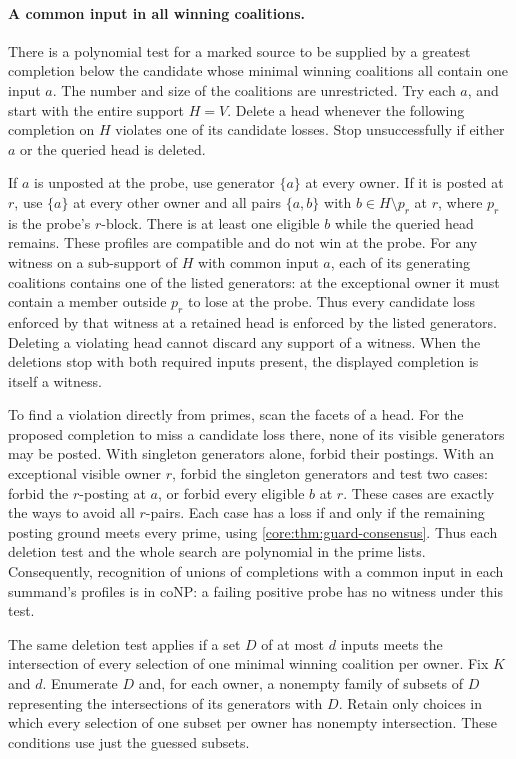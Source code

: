 \paragraph{A common input in all winning coalitions.}
There is a polynomial test for a marked source to be supplied
by a greatest completion below the candidate whose minimal
winning coalitions all contain one input $a$. The number and
size of the coalitions are unrestricted. Try each $a$, and
start with the entire support $H=V$. Delete a head whenever
the following completion on $H$ violates one of its candidate
losses. Stop unsuccessfully if either $a$ or the queried head
is deleted.

If $a$ is unposted at the probe, use generator $\{a\}$
at every owner. If it is posted at $r$, use $\{a\}$ at every
other owner and all pairs $\{a,b\}$ with $b\in H\setminus p_r$
at $r$, where $p_r$ is the probe's $r$-block. There is at
least one eligible $b$ while the queried head remains.
These profiles are compatible and do not win at the probe.
For any witness on a sub-support of $H$ with common input $a$,
each of its generating coalitions contains one of the listed
generators: at the exceptional owner it must contain a member
outside $p_r$ to lose at the probe. Thus every candidate loss
enforced by that witness at a retained head is enforced by the
listed generators. Deleting a violating head cannot discard
any support of a witness. When the deletions stop with both
required inputs present, the displayed completion is itself
a witness.

To find a violation directly from primes, scan the facets
of a head. For the proposed completion to miss a candidate
loss there, none of its visible generators may be posted.
With singleton generators alone, forbid their postings.
With an exceptional visible owner $r$, forbid the singleton
generators and test two cases: forbid the $r$-posting at $a$,
or forbid every eligible $b$ at $r$. These cases are exactly
the ways to avoid all $r$-pairs. Each case has a loss if and
only if the remaining posting ground meets every prime,
using \cref{core:thm:guard-consensus}. Thus each deletion test
and the whole search are polynomial in the prime lists.
Consequently, recognition of unions of completions with a
common input in each summand's profiles is in coNP: a failing
positive probe has no witness under this test.

The same deletion test applies if a set $D$ of at most $d$
inputs meets the intersection of every selection of one
minimal winning coalition per owner. Fix $K$ and $d$.
Enumerate $D$ and, for each owner, a nonempty family of
subsets of $D$ representing the intersections of its
generators with $D$. Retain only choices in which every
selection of one subset per owner has nonempty intersection.
These conditions use just the guessed subsets.

